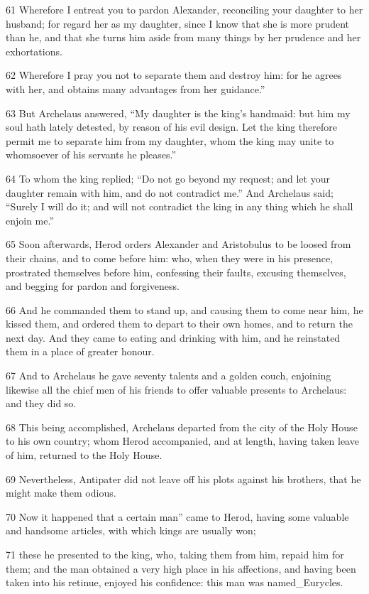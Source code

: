 61 Wherefore I entreat you to pardon Alexander, reconciling your daughter to her husband; for regard her as my daughter, since I know that she is more prudent than he, and that she turns him aside from many things by her prudence and her exhortations. 

62 Wherefore I pray you not to separate them and destroy him: for he agrees with her, and obtains many advantages from her guidance.” 

63 But Archelaus answered, “My daughter is the king’s handmaid: but him my soul hath lately detested, by reason of his evil design. Let the king therefore permit me to separate him from my daughter, whom the king may unite to whomsoever of his servants he pleases.” 

64 To whom the king replied; “Do not go beyond my request; and let your daughter remain with him, and do not contradict me.” And Archelaus said; “Surely I will do it; and will not contradict the king in any thing which he shall enjoin me.” 

65 Soon afterwards, Herod orders Alexander and Aristobulus to be loosed from their chains, and to come before him: who, when they were in his presence, prostrated themselves before him, confessing their faults, excusing themselves, and begging for pardon and forgiveness. 

66 And he commanded them to stand up, and causing them to come near him, he kissed them, and ordered them to depart to their own homes, and to return the next day. And they came to eating and drinking with him, and he reinstated them in a place of greater honour. 

67 And to Archelaus he gave seventy talents and a golden couch, enjoining likewise all the chief men of his friends to offer valuable presents to Archelaus: and they did so. 

68 This being accomplished, Archelaus departed from the city of the Holy House to his own country; whom Herod accompanied, and at length, having taken leave of him, returned to the Holy House. 

69 Nevertheless, Antipater did not leave off his plots against his brothers, that he might make them odious. 

70 Now it happened that a certain man” came to Herod, having some valuable and handsome articles, with which kings are usually won; 

71 these he presented to the king, who, taking them from him, repaid him for them; and the man obtained a very high place in his affections, and having been taken into his retinue, enjoyed his confidence: this man was named_Eurycles.


